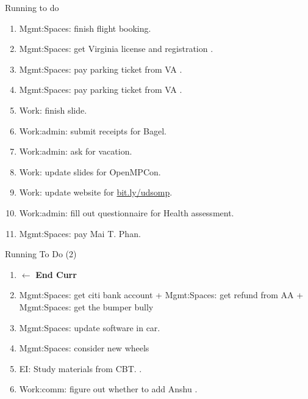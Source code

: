 \begin{frame}{Running to do}
\begin{enumerate}
\item \tiny Mgmt:Spaces: finish flight booking. 
\item \tiny Mgmt:Spaces: get Virginia license and registration .
\item \tiny Mgmt:Spaces: pay parking ticket from VA  . 
\item \tiny Mgmt:Spaces: pay parking ticket from VA  .
\item \tiny Work: finish slide. 
\item \tiny Work:admin: submit receipts for Bagel.
\item \tiny Work:admin: ask for vacation.      
\item \tiny Work: update slides for OpenMPCon. 
\item \tiny Work: update website for  \url{bit.ly/udsomp}. 
\item \tiny Work:admin: fill out questionnaire for Health assessment.
\item \tiny Mgmt:Spaces: pay Mai T. Phan. 
  \seti
\end{enumerate}
  
\end{frame}
  
\begin{frame}{Running To Do (2)} 
  \begin{enumerate}
    \conti    
  \item[] \tiny  $\leftarrow$ \textbf{End Curr}
  \item \tiny Mgmt:Spaces: get citi bank account + Mgmt:Spaces: get refund from AA  + Mgmt:Spaces: get the bumper bully 
  \item \tiny Mgmt:Spaces: update software  in car. 
  \item \tiny  Mgmt:Spaces: consider new wheels 
  \item \tiny EI: Study materials from CBT.   .
  \item \tiny Work:comm: figure out whether to add Anshu .
  \end{enumerate}
  
 \end{frame}
